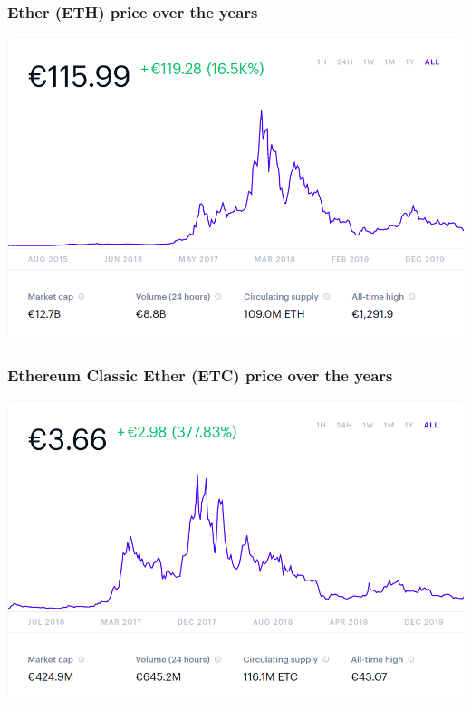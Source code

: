 \documentclass[11pt]{beamer}  %
\begin{document}
\begin{frame}\frametitle{Ether (ETH) price over the years}

  \begin{center}
    \includegraphics[scale=0.29,clip=false]{pictures/ethereum.png}
  \end{center}

\end{frame}

\begin{frame}\frametitle{Ethereum Classic Ether (ETC) price over the years}

  \begin{center}
    \includegraphics[scale=0.29,clip=false]{pictures/ethereum-classic.png}
  \end{center}

\end{frame}
\end{document}
